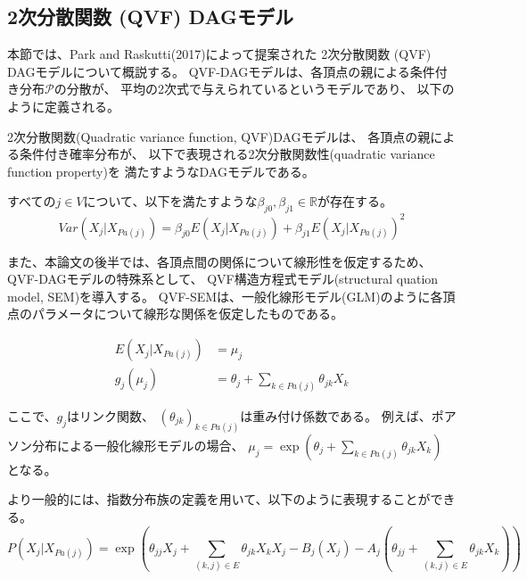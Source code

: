 
\subsection{2次分散関数 (QVF) DAGモデル}

本節では、Park and Raskutti(2017)\cite{Park2017-hw}によって提案された
2次分散関数 (QVF) DAGモデルについて概説する。
QVF-DAGモデルは、各頂点の親による条件付き分布$\mathcal P$の分散が、
平均の2次式で与えられているというモデルであり、
以下のように定義される。

\begin{df}
2次分散関数(Quadratic variance function, QVF)DAGモデルは、
各頂点の親による条件付き確率分布が、
以下で表現される2次分散関数性(quadratic variance function property)を
満たすようなDAGモデルである。

すべての$j \in V$について、以下を満たすような$\beta_{j0}, \beta_{j1} \in \mathbb R$が存在する。
\begin{equation}
\mathit{Var}(X_j|X_{Pa(j)}) = \beta_{j0} E(X_j | X_{Pa(j)}) + \beta_{j1} E(X_j | X_{Pa(j)})^2
\label{QVF}
\end{equation}
\end{df}

また、本論文の後半では、各頂点間の関係について線形性を仮定するため、
QVF-DAGモデルの特殊系として、
QVF構造方程式モデル(structural quation model, SEM)を導入する。
QVF-SEMは、一般化線形モデル(GLM)のように各頂点のパラメータについて線形な関係を仮定したものである。

\begin{equation}
  \begin{align}
    E(X_j | X_{Pa(j)}) &= \mu_j \\
    g_j(\mu_j) &= \theta_j + \sum_{k \in Pa(j)} \theta_{jk}X_k
  \end{align}
\end{equation}

ここで、$g_j$はリンク関数、
$(\theta_{jk})_{k \in Pa(j)}$は重み付け係数である。
例えば、ポアソン分布による一般化線形モデルの場合、
$\mu_j = \exp(\theta_j + \sum_{k \in Pa(j)} \theta_{jk}X_k)$
となる。

より一般的には、指数分布族の定義を用いて、以下のように表現することができる。
\begin{equation}
  P(X_j|X_{Pa(j)}) = \exp \left( \theta_{jj}X_j  + \sum_{(k,j)\in E} \theta_{jk}X_k X_j -
  B_j(X_j) - A_j \left( \theta_{jj} + \sum_{(k,j) \in E} \theta_{jk} X_k \right) \right)
\end{equation}

